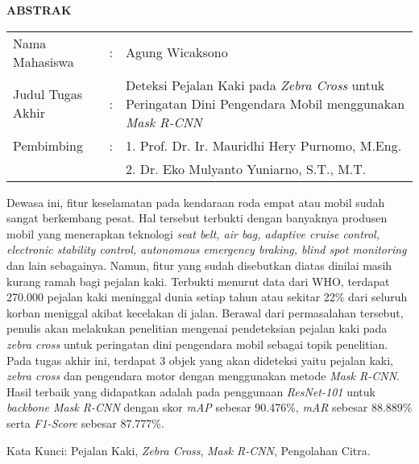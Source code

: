 \begin{center}
  \large\textbf{ABSTRAK}
\end{center}


\vspace{2ex}

\begingroup
  \setlength{\tabcolsep}{0pt}

  \noindent
  \begin{tabularx}{\textwidth}{l >{\centering}m{2em} X}
    Nama Mahasiswa    &:& Agung Wicaksono \\

    Judul Tugas Akhir &:&	Deteksi Pejalan Kaki pada \textit{Zebra Cross} untuk Peringatan Dini Pengendara Mobil menggunakan \textit{Mask R-CNN} \\

    Pembimbing        &:& 1. Prof. Dr. Ir. Mauridhi Hery Purnomo, M.Eng. \\
                      & & 2. Dr. Eko Mulyanto Yuniarno, S.T., M.T. \\
  \end{tabularx}
\endgroup

Dewasa ini, fitur keselamatan pada kendaraan roda empat atau mobil sudah sangat berkembang pesat. Hal tersebut terbukti dengan banyaknya produsen mobil yang menerapkan teknologi \textit{seat belt, air bag, adaptive cruise control, electronic stability control, autonomous emergency braking, blind spot monitoring} dan lain sebagainya. Namun, fitur yang sudah disebutkan diatas dinilai masih kurang ramah bagi pejalan kaki. Terbukti menurut data dari WHO, terdapat 270.000 pejalan kaki meninggal dunia setiap tahun atau sekitar 22\% dari seluruh korban meniggal akibat kecelakan di jalan. Berawal dari permasalahan tersebut, penulis akan melakukan penelitian mengenai pendeteksian pejalan kaki pada \textit{zebra cross} untuk peringatan dini pengendara mobil sebagai topik penelitian. Pada tugas akhir ini, terdapat 3 objek yang akan dideteksi yaitu pejalan kaki, \textit{zebra cross} dan pengendara motor dengan menggunakan metode \textit{Mask R-CNN}. Hasil terbaik yang didapatkan adalah pada penggunaan \textit{ResNet-101} untuk \textit{backbone Mask R-CNN} dengan skor \textit{mAP} sebesar 90.476\%, \textit{mAR} sebesar 88.889\% serta \textit{F1-Score} sebesar 87.777\%.

Kata Kunci: Pejalan Kaki, \emph{Zebra Cross}, \emph{Mask R-CNN}, Pengolahan Citra.
